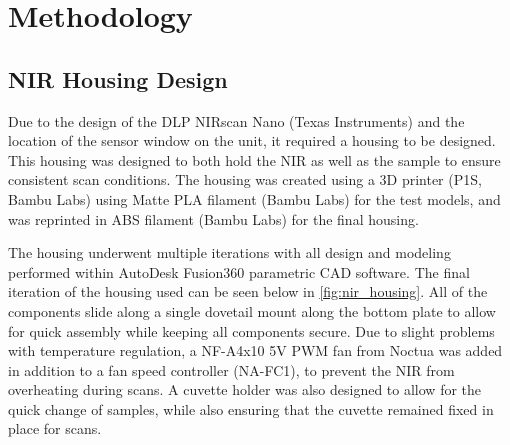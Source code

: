 \documentclass[12pt]{report}
\renewcommand{\cite}{\supercite}
\begin{document}
\section{Methodology}
\subsection{NIR Housing Design}

Due to the design of the DLP NIRscan Nano (Texas Instruments) and the location of the sensor window on the unit, it required a housing to be designed. This housing was designed to both hold the NIR as well as the sample to ensure consistent scan conditions. The housing was created using a 3D printer (P1S, Bambu Labs) using Matte PLA filament (Bambu Labs) for the test models, and was reprinted in ABS filament (Bambu Labs) for the final housing.

The housing underwent multiple iterations with all design and modeling performed within AutoDesk Fusion360 parametric CAD software.\cite{Fusion360} The final iteration of the housing used can be seen below in \autoref{fig:nir_housing}. All of the components slide along a single dovetail mount along the bottom plate to allow for quick assembly while keeping all components secure. Due to slight problems with temperature regulation, a NF-A4x10 5V PWM fan from Noctua was added in addition to a fan speed controller (NA-FC1), to prevent the NIR from overheating during scans. A cuvette holder was also designed to allow for the quick change of samples, while also ensuring that the cuvette remained fixed in place for scans.
\end{document}

